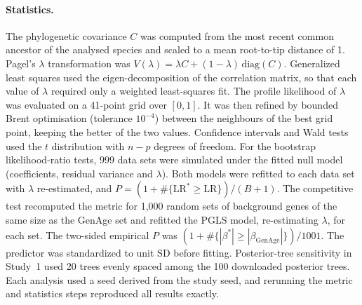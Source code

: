 \documentclass[11pt]{article}
\begin{document}
\paragraph{Statistics.} The phylogenetic covariance $C$ was computed from the most recent common ancestor of the analysed species and scaled to a mean root-to-tip distance of 1. Pagel's $\lambda$ transformation was $V(\lambda) = \lambda C + (1-\lambda)\,\mathrm{diag}(C)$. Generalized least squares used the eigen-decomposition of the correlation matrix, so that each value of $\lambda$ required only a weighted least-squares fit. The profile likelihood of $\lambda$ was evaluated on a 41-point grid over $[0,1]$. It was then refined by bounded Brent optimisation (tolerance $10^{-4}$) between the neighbours of the best grid point, keeping the better of the two values. Confidence intervals and Wald tests used the $t$ distribution with $n-p$ degrees of freedom. For the bootstrap likelihood-ratio tests, 999 data sets were simulated under the fitted null model (coefficients, residual variance and $\lambda$). Both models were refitted to each data set with $\lambda$ re-estimated, and $P = (1 + \#\{\mathrm{LR}^* \geq \mathrm{LR}\})/(B+1)$. The competitive test recomputed the metric for 1,000 random sets of background genes of the same size as the GenAge set and refitted the PGLS model, re-estimating $\lambda$, for each set. The two-sided empirical $P$ was $(1 + \#\{|\beta^*| \geq |\beta_\mathrm{GenAge}|\})/1001$. The predictor was standardized to unit SD before fitting. Posterior-tree sensitivity in Study~1 used 20 trees evenly spaced among the 100 downloaded posterior trees. Each analysis used a seed derived from the study seed, and rerunning the metric and statistics steps reproduced all results exactly.
\end{document}
